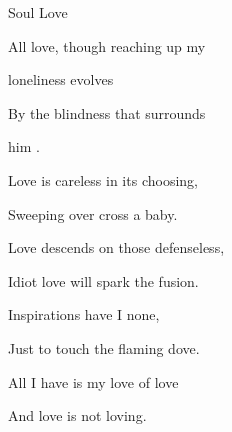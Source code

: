 \begin{song}{Soul Love}{
	
	\chordset[Verse]{ \GMaj \Em \CMaj \Bm \Am \DMaj }

	\chordset[Chorus]{ \FMaj \GSeven \Cm \GMajShE \DMajShA }
	
}
\begin{songverse}
All love, though reaching up my 

loneliness evolves\quad{}

By the blindness that surrounds

 him .
\end{songverse}
\begin{songchorus}

Love is careless in its choosing,

Sweeping over cross a baby.

Love descends on those defenseless,

Idiot love will spark the fusion.


Inspirations have I none,

Just to touch the flaming dove.

All I have is my love of love

And love is not loving.

\end{songchorus}

\end{song}